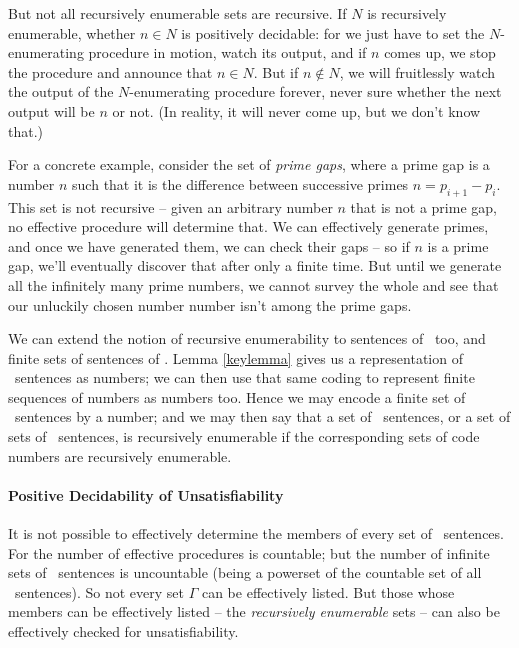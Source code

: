 But not all recursively enumerable sets are recursive. If $N$ is recursively enumerable, whether $n\in N$ is positively decidable: for we just have to set the $N$-enumerating procedure in motion, watch its output, and if $n$ comes up, we stop the procedure and announce that $n\in N$. But if $n\notin N$, we will fruitlessly watch the output of the $N$-enumerating procedure forever, never sure whether the next output will be $n$ or not. (In reality, it will never come up, but we don't know that.)

For a concrete example, consider the set of \emph{prime gaps}, where a prime gap is a number $n$ such that it is the difference between successive primes $n = p_{i+1}-p_{i}$. This set is not recursive – given an arbitrary number $n$ that is not a prime gap, no effective procedure will determine that. We can effectively generate primes, and once we have generated them, we can check their gaps – so if $n$ is a prime gap, we'll eventually discover that after only a finite time. But until we generate all the infinitely many prime numbers, we cannot survey the whole and see that our unluckily chosen number number isn't among the prime gaps.

We can extend the notion of recursive enumerability to sentences of \lone\ too, and finite sets of sentences of \lone. Lemma \ref{keylemma} gives us a representation of \lone\ sentences as numbers; we can then use that same coding to represent finite sequences of numbers as numbers too. Hence we may encode a finite set of \lone\ sentences by a number; and we may then say that a set of \lone\ sentences, or a set of sets of \lone\ sentences, is recursively enumerable if the corresponding sets of code numbers are recursively enumerable.



\paragraph{Positive Decidability of Unsatisfiability}  It is not possible to effectively determine the members of every set of \lone\ sentences. For the number of effective procedures is countable; but the number of infinite sets of \lone\ sentences is uncountable (being a powerset of the countable set of all \lone\ sentences).  So not every set $\Gamma$ can be effectively listed. But those whose members can be effectively listed – the \emph{recursively enumerable} sets – can also be effectively checked for unsatisfiability. 

